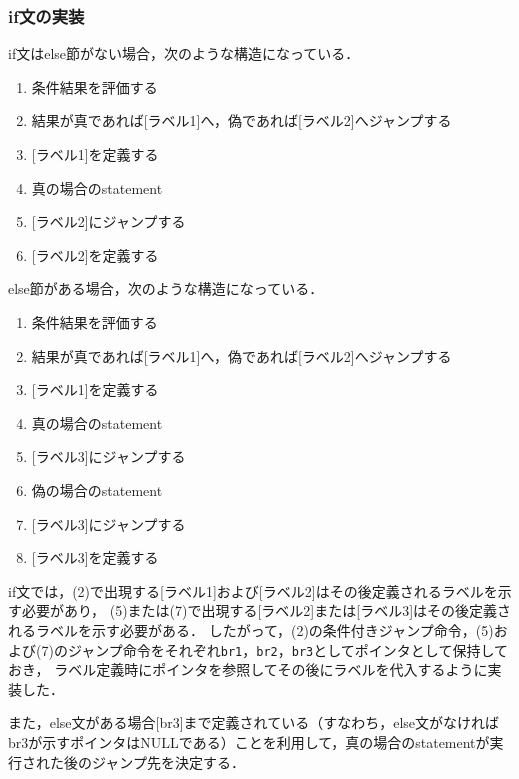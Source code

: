 \documentclass[uplatex]{jsarticle}
\begin{document}
\subsubsection{if文の実装}
if文はelse節がない場合，次のような構造になっている．
\begin{enumerate}
  \item {条件結果を評価する}
  \item {結果が真であれば[ラベル1]へ，偽であれば[ラベル2]へジャンプする}
  \item {[ラベル1]を定義する}
  \item {真の場合のstatement}
  \item {[ラベル2]にジャンプする}
  \item {[ラベル2]を定義する}
\end{enumerate}

else節がある場合，次のような構造になっている．
\begin{enumerate}
  \item {条件結果を評価する}
  \item {結果が真であれば[ラベル1]へ，偽であれば[ラベル2]へジャンプする}
  \item {[ラベル1]を定義する}
  \item {真の場合のstatement}
  \item {[ラベル3]にジャンプする}
  \item {偽の場合のstatement}
  \item {[ラベル3]にジャンプする}
  \item {[ラベル3]を定義する}
\end{enumerate}

if文では，(2)で出現する[ラベル1]および[ラベル2]はその後定義されるラベルを示す必要があり，
(5)または(7)で出現する[ラベル2]または[ラベル3]はその後定義されるラベルを示す必要がある．
したがって，(2)の条件付きジャンプ命令，(5)および(7)のジャンプ命令をそれぞれ\verb#br1#，\verb#br2#，\verb#br3#としてポインタとして保持しておき，
ラベル定義時にポインタを参照してその後にラベルを代入するように実装した．

また，else文がある場合[br3]まで定義されている（すなわち，else文がなければbr3が示すポインタはNULLである）ことを利用して，真の場合のstatementが実行された後のジャンプ先を決定する．
\end{document}
